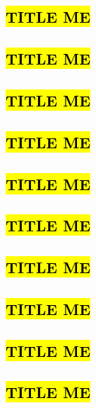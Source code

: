 \subsection{\hl{TITLE ME}}


\subsection{\hl{TITLE ME}}


\clearpage

\subsection{\hl{TITLE ME}}


\subsection{\hl{TITLE ME}}


\subsection{\hl{TITLE ME}}


\subsection{\hl{TITLE ME}}


\subsection{\hl{TITLE ME}}


\subsection{\hl{TITLE ME}}


\subsection{\hl{TITLE ME}}


\subsection{\hl{TITLE ME}}
